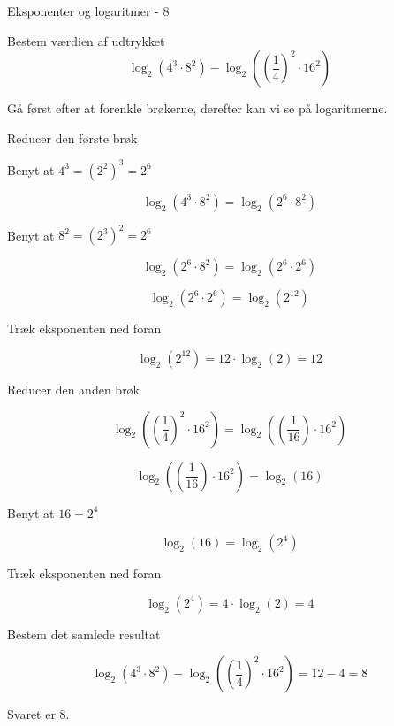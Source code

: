 \documentclass{article}
\begin{document}
\newpage
\begin{exercise}{Eksponenter og logaritmer - 8}
	
	Bestem værdien af udtrykket
	\[
	\log_2\left( 4^3 \cdot 8^2 \right) - \log_2 \left( \left(\frac{1}{4}\right)^2 \cdot 16^2\right)
	\]
	
	
	\hint
	Gå først efter at forenkle brøkerne, derefter kan vi se på logaritmerne.
	
	\hint
	Reducer den første brøk 
	
	\hint
	Benyt at $4^3 = (2^2)^3 = 2^6$
  	
	\hint
	\[
	\log_2\left( 4^3 \cdot 8^2 \right) = \log_2\left( 2^6 \cdot 8^2 \right) 
	\]
	
	\hint
	Benyt at $8^2 = (2^3)^2 = 2^6$
	
	\hint
	\[
	\log_2\left( 2^6 \cdot 8^2 \right) = \log_2\left( 2^6 \cdot 2^6 \right)
	\]
	
	\hint
	\[
	\log_2\left( 2^6 \cdot 2^6 \right) = \log_2 (2^{12})
	\]
	
	
	\hint
	Træk eksponenten ned foran
	
	\hint
	\[
	\log_2\left( 2^{12} \right) = 12 \cdot \log_2(2)  = 12
	\]
	
	\hint 
	Reducer den anden brøk
	
	\hint
	\[
	 \log_2\left( \left(\frac{1}{4}\right)^2 \cdot 16^2\right) = \log_2\left( \left(\frac{1}{16}\right) \cdot 16^2\right)
	\]
	
	\hint
	\[
	\log_2\left( \left(\frac{1}{16}\right) \cdot 16^2\right) = \log_2\left(16 \right)
	\]
	
	\hint
	Benyt at $16 = 2^4$
	
	\hint
	\[
	\log_2\left(16 \right) = \log_2\left(2^4 \right)
	\]
	
	\hint
	Træk eksponenten ned foran
	
	\hint
	\[
	\log_2\left( 2^{4} \right) = 4 \cdot \log_2(2)  = 4
	\]
	
	\hint
	Bestem det samlede resultat
	
	\hint
	\[
	\log_2\left( 4^3 \cdot 8^2 \right) - \log_2 \left( \left(\frac{1}{4}\right)^2 \cdot 16^2\right) = 12 - 4 = 8
	\]
	
	\hint
	Svaret er $8$.
	
\end{exercise}

\newpage
\end{document}
